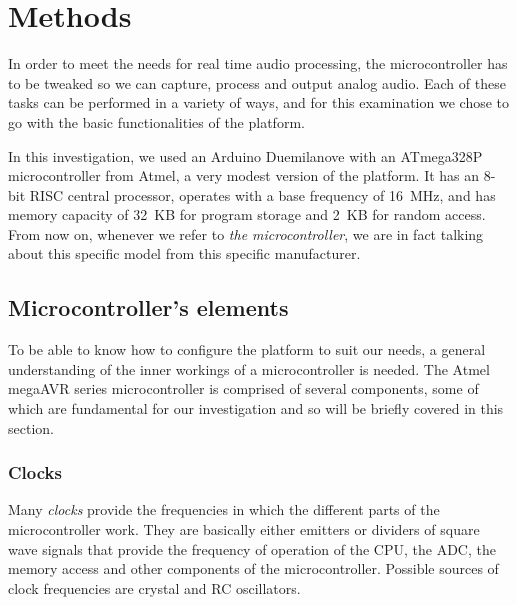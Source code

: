 
\section{Methods}
\label{sec:methods}

In order to meet the needs for real time audio processing, the microcontroller
has to be tweaked so we can capture, process and output analog audio. Each of
these tasks can be performed in a variety of ways, and for this examination we
chose to go with the basic functionalities of the platform.

In this investigation, we used an Arduino Duemilanove with an ATmega328P
microcontroller from Atmel, a very modest version of the platform. It has an
8-bit RISC central processor, operates with a base frequency of 16~MHz, and
has memory capacity of 32~KB for program storage and 2~KB for random access.
From now on, whenever we refer to \emph{the microcontroller}, we are in fact
talking about this specific model from this specific manufacturer.

\subsection{Microcontroller's elements}

\setlength{\itemsep}{0em}

To be able to know how to configure the platform to suit our needs, a general
understanding of the inner workings of a microcontroller is needed. The Atmel
megaAVR series microcontroller is comprised of several components, some
of which are fundamental for our investigation and so will be briefly covered
in this section.

\subsubsection{Clocks}

Many \emph{clocks} provide the frequencies in which the different parts of the
microcontroller work. They are basically either emitters or dividers of square
wave signals that provide the frequency of operation of the CPU, the ADC, the
memory access and other components of the microcontroller. Possible sources of
clock frequencies are crystal and RC oscillators.

